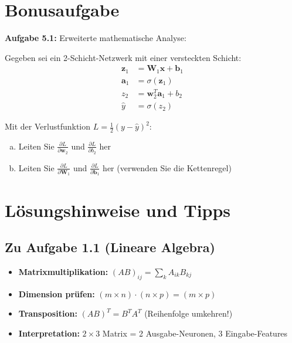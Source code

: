 ﻿\documentclass[12pt,a4paper]{article}
\begin{document}
\section{Bonusaufgabe}

\textbf{Aufgabe 5.1:} Erweiterte mathematische Analyse:

Gegeben sei ein 2-Schicht-Netzwerk mit einer versteckten Schicht:
\begin{align}
\mathbf{z}_1 &= \mathbf{W}_1 \mathbf{x} + \mathbf{b}_1 \\
\mathbf{a}_1 &= \sigma(\mathbf{z}_1) \\
z_2 &= \mathbf{w}_2^T \mathbf{a}_1 + b_2 \\
\hat{y} &= \sigma(z_2)
\end{align}

Mit der Verlustfunktion $L = \frac{1}{2}(y - \hat{y})^2$:

\begin{enumerate}[(a)]
    \item Leiten Sie $\frac{\partial L}{\partial \mathbf{w}_2}$ und $\frac{\partial L}{\partial b_2}$ her
    \item Leiten Sie $\frac{\partial L}{\partial \mathbf{W}_1}$ und $\frac{\partial L}{\partial \mathbf{b}_1}$ her (verwenden Sie die Kettenregel)
\end{enumerate}

\section*{Lösungshinweise und Tipps}

\subsection*{Zu Aufgabe 1.1 (Lineare Algebra)}
\begin{itemize}
    \item \textbf{Matrixmultiplikation:} $(AB)_{ij} = \sum_k A_{ik} B_{kj}$
    \item \textbf{Dimension prüfen:} $(m \times n) \cdot (n \times p) = (m \times p)$
    \item \textbf{Transposition:} $(AB)^T = B^T A^T$ (Reihenfolge umkehren!)
    \item \textbf{Interpretation:} $2 \times 3$ Matrix = 2 Ausgabe-Neuronen, 3 Eingabe-Features
\end{itemize}
\end{document}
